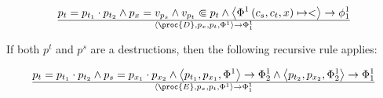 \begin{equation}
{
    p_t = p_{t_1}\cdot p_{t_2}
  \wedge
    p_x = v_{p_s}
  \wedge
    v_{p_t}\Subset{p_t}
  \wedge
    \left\langle\Phi^1\left(c_s, c_t, x\right)\mapsto <\right\rangle\rightarrow\phi^1_1
}\over{
  \left\langle\proc{D},p_x,p_t,\Phi^1\right\rangle
  \rightarrow
  \Phi^1_1
}
\end{equation}

If both $p^t$ and $p^s$ are a destructions, then the following recursive rule applies:

\begin{equation}
{
    p_t = p_{t_1}\cdot p_{t_2}
  \wedge
    p_s = p_{x_1}\cdot p_{x_2}
  \wedge
    \left\langle p_{t_1}, p_{x_1}, \Phi^1\right\rangle
    \rightarrow
    \Phi^1_2
  \wedge
    \left\langle p_{t_2}, p_{x_2}, \Phi^1_2\right\rangle
    \rightarrow
    \Phi^1_1
}\over{
  \left\langle\proc{E},p_x,p_t,\Phi^1\right\rangle
  \rightarrow
  \Phi^1_1
}
\end{equation}
